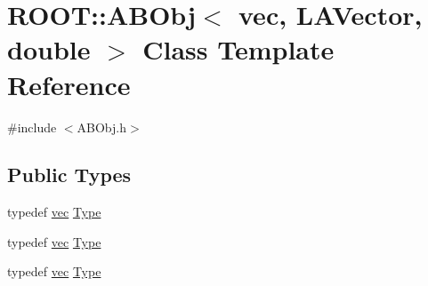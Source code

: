 \hypertarget{classROOT_1_1Minuit2_1_1ABObj_3_01vec_00_01LAVector_00_01double_01_4}{}\section{R\+O\+OT\+:\+:A\+B\+Obj$<$ vec, L\+A\+Vector, double $>$ Class Template Reference}
\label{classROOT_1_1Minuit2_1_1ABObj_3_01vec_00_01LAVector_00_01double_01_4}


{\ttfamily \#include $<$A\+B\+Obj.\+h$>$}

\subsection*{Public Types}
\begin{DoxyCompactItemize}
\item 
typedef \mbox{\hyperlink{classROOT_1_1Minuit2_1_1vec}{vec}} \mbox{\hyperlink{classROOT_1_1Minuit2_1_1ABObj_3_01vec_00_01LAVector_00_01double_01_4_a4b4f01cea6a833a82f65ddadd8cb0f40}{Type}}
\item 
typedef \mbox{\hyperlink{classROOT_1_1Minuit2_1_1vec}{vec}} \mbox{\hyperlink{classROOT_1_1Minuit2_1_1ABObj_3_01vec_00_01LAVector_00_01double_01_4_a4b4f01cea6a833a82f65ddadd8cb0f40}{Type}}
\item 
typedef \mbox{\hyperlink{classROOT_1_1Minuit2_1_1vec}{vec}} \mbox{\hyperlink{classROOT_1_1Minuit2_1_1ABObj_3_01vec_00_01LAVector_00_01double_01_4_a4b4f01cea6a833a82f65ddadd8cb0f40}{Type}}
\end{DoxyCompactItemize}

